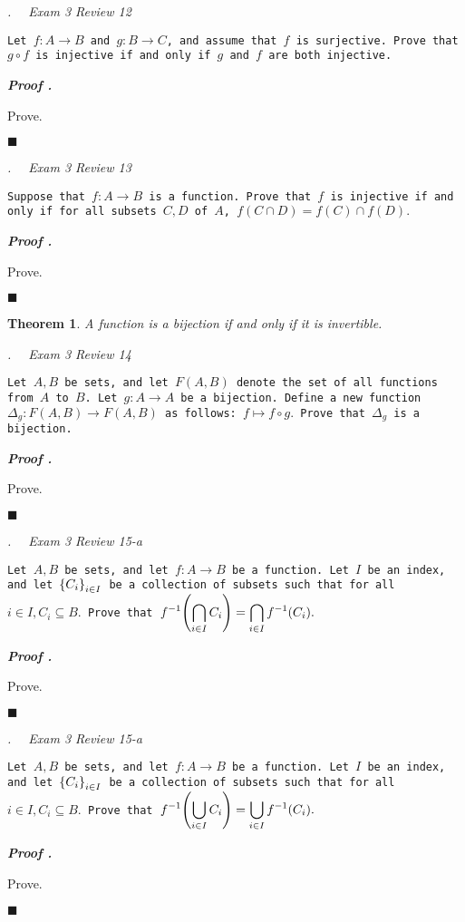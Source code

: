 \documentclass[11pt,letter]{article}
\newcounter{nq}[section]
\newcounter{np}[section]
\newtheorem{thm}{Theorem}[section]
\newenvironment*{p}{\par\noindent\textbf{\textit{Proof \stepcounter{np}\thenp. }}\par}{\par\hfill $\blacksquare$\par}
\newenvironment*{q}[1]{\noindent\emph{\thesection.\stepcounter{nq}\thenq$\quad $ #1}\par\noindent\texttt}{}
\def\dsst{\displaystyle}
\def\f{f^{-1}}
\def\of{\circ}
\begin{document}
\begin{framed}\begin{q}
	{Exam 3 Review 12}
	{Let $f:A\to B$ and $g:B\to C$, and assume that $f$ is surjective. Prove that $g\of f$ is injective if and only if $g$ and $f$ are both injective.}
\end{q}\end{framed}
\begin{p}
	Prove.	
\end{p}

\begin{framed}\begin{q}
	{Exam 3 Review 13}
	{Suppose that $f:A\to B$ is a function. Prove that $f$ is injective if and only if for all subsets $C,D$ of $A$, $f(C\cap D)=f(C)\cap f(D).$}
\end{q}\end{framed}
\begin{p}
	Prove.	
\end{p}

\begin{thm}
A function is a bijection if and only if it is invertible.	
\end{thm}

\begin{framed}\begin{q}
	{Exam 3 Review 14}
	{Let $A,B$ be sets, and let $F(A,B)$ denote the set of all functions from $A$ to $B$. Let $g:A\to A$ be a bijection. Define a new function $\Delta_g: F(A,B)\to F(A,B)$ as follows: $f\mapsto f\of g.$ Prove that $\Delta_g$ is a bijection.}
\end{q}\end{framed}
\begin{p}
	Prove.	
\end{p}

\begin{framed}\begin{q}
	{Exam 3 Review 15-a}
	{Let $A,B$ be sets, and let $f:A\to B$ be a function. Let $I$ be an index, and let $\qty{C_i}_{i\in I}$ be a collection of subsets such that for all $i\in I,C_i\subseteq B.$ Prove that $\dsst\f\qty(\bigcap_{i\in I}C_i)=\bigcap_{i\in I}\f(C_i).$}
\end{q}\end{framed}
\begin{p}
	Prove.	
\end{p}

\begin{framed}\begin{q}
	{Exam 3 Review 15-a}
	{Let $A,B$ be sets, and let $f:A\to B$ be a function. Let $I$ be an index, and let $\qty{C_i}_{i\in I}$ be a collection of subsets such that for all $i\in I,C_i\subseteq B.$ Prove that $\dsst\f\qty(\bigcup_{i\in I}C_i)=\bigcup_{i\in I}\f(C_i).$}
\end{q}\end{framed}
\begin{p}
	Prove.	
\end{p}

\label{LastPage}
\end{document}
